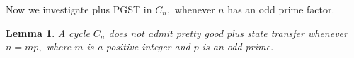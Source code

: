 \documentclass[12pt,a4paper]{article}
\newtheorem{lem}{Lemma}
\def \e {{\bf e}}
\def \e {{\mathbf e}}
\newcommand{\ob}[1]{\left(#1\right)}
\begin{document}
Now we investigate plus PGST in $C_n,$ whenever $n$ has an odd prime factor.  
\begin{lem}\label{5l11}
   A cycle $C_n$ does not admit pretty good plus state transfer 
   whenever $n=mp,$ where $m$ is a positive integer and $p$ is an odd prime.  
\end{lem}
\end{document}
